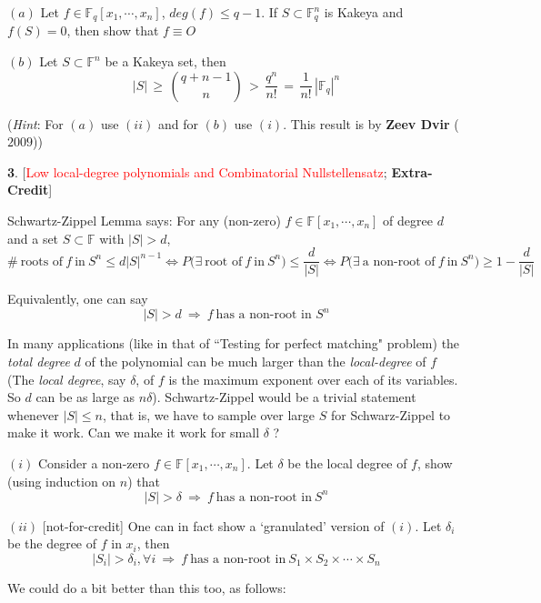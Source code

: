 \documentclass[10pt]{article}
\begin{document}
\hspace{0.2 in} $(a)$ Let $f\in \mathbb{F}_q[x_1,\cdots, x_n]$, $deg(f)\le q-1$. If $S\subset \mathbb{F}_q^n$ is Kakeya and $f(S)=0$, then show that $f\equiv O$ \medskip

\hspace{0.2 in} $(b)$ Let $S\subset \mathbb{F}^n$ be a Kakeya set, then $$|S|\,\ge\,\binom{q+n-1}{n}\,>\, \frac{q^n}{n!}\,=\,\frac{1}{n!}\,|\mathbb{F}_q|^n$$

\hspace{0.2 in}(\emph{Hint}: For $(a)$ use $(ii)$ and for $(b)$ use $(i)$. This result is by \textbf{Zeev Dvir} ($2009$))

\pagebreak

\textbf{3}. [\textcolor{red}{Low local-degree polynomials and Combinatorial Nullstellensatz}; \textbf{Extra-Credit}]\medskip

Schwartz-Zippel Lemma says: For any (non-zero) $f\in \mathbb{F}[x_1,\cdots, x_n]$ of degree $d$ and a set $S\subset \mathbb{F}$ with $|S|>d$, $$\boxed{\#~ \text{roots of}~f~\text{in}~S^n\le d|S|^{n-1}}\Leftrightarrow \boxed{P\big(\exists~ \text{root of}~ f~ \text{in}~ S^n\big)\le \frac{d}{|S|}}\Leftrightarrow \boxed{P\big(\exists~ \text{a non-root of}~ f~ \text{in}~ S^n\big)\ge 1-\frac{d}{|S|}}$$

Equivalently, one can say $$\boxed{|S|>d ~\Rightarrow~ f~ \text{has a non-root in}\,\, S^n}$$

In many applications (like in that of ``Testing for perfect matching" problem) the \emph{total degree} $d$ of the polynomial can be much larger than the \emph{local-degree} of $f$ (The \emph{local degree}, say $\delta$, of $f$ is the maximum exponent over each of its variables. So $d$ can be as large as $n\delta$). Schwartz-Zippel would be a trivial statement whenever $|S|\le n$, that is, we have to sample over large $S$ for Schwarz-Zippel to make it work. Can we make it work for small $\delta$ ?\medskip

$(i)$ Consider a non-zero $f\in \mathbb{F}[x_1,\cdots, x_n]$. Let $\delta$ be the local degree of $f$, show (using induction on $n$) that $$\boxed{|S|>\delta ~\Rightarrow~ f~ \text{has a non-root in}~ S^n}$$

$(ii)$ [not-for-credit] One can in fact show a `granulated' version of $(i)$. Let $\delta_i$ be the degree of $f$ in $x_i$, then $$\boxed{|S_i|>\delta_i, \forall i ~\Rightarrow~ f~ \text{has a non-root in}~ S_1\times S_2\times\cdots \times S_n}$$

We could do a bit better than this too, as follows:\medskip
\end{document}
